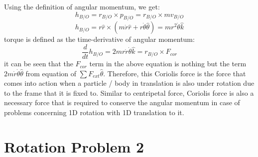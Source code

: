 Using the definition of angular momentum, we get:
\begin{equation}
	h_{B/O} = r_{B/O} \times p_{B/O} = r_{B/O} \times m v_{B/O}
\end{equation}
\begin{equation}
	h_{B/O} = r \hat{r} \times ( m \dot{r}\hat{r} + r \dot{\theta} \hat{\theta}) = m r^{2} \dot{\theta} \hat{k}
\end{equation}
torque is defined as the time-derivative of angular momentum:
\begin{equation}
	\frac{d}{dt}h_{B/O} = 2 m r \dot{r} \dot{\theta} \hat{k} = r_{B/O} \times F_{cor}
\end{equation}
it can be seen that the $F_{cor}$ term in the above equation is nothing but the term $2 m \dot{r} \dot{\theta} \hat{\theta}$ from equation of $\sum F_{ext} \hat{\theta}$. Therefore, this Coriolis force is the force that comes into action when a particle / body in translation is also under rotation due to the frame that it is fixed to. Similar to centripetal force, Coriolis force is also a necessary force that is required to conserve the angular momentum in case of problems concerning 1D rotation with 1D translation to it.

\section{Rotation Problem 2}

